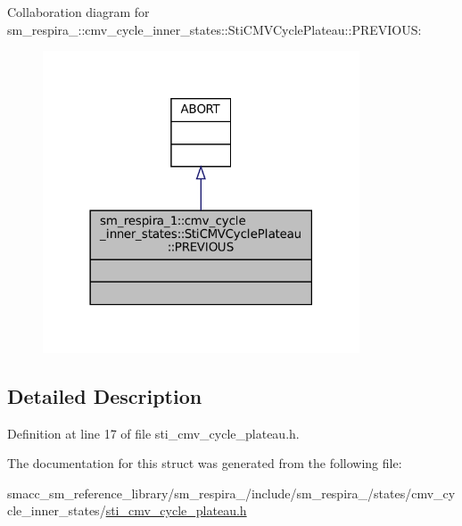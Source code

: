 Collaboration diagram for sm\+\_\+respira\+\_\+:\+:cmv\+\_\+cycle\+\_\+inner\+\_\+states\+:\+:Sti\+C\+M\+V\+Cycle\+Plateau\+:\+:P\+R\+E\+V\+I\+O\+US\+:
\nopagebreak
\begin{figure}[H]
\begin{center}
\leavevmode
\includegraphics[width=266pt]{structsm__respira__1_1_1cmv__cycle__inner__states_1_1StiCMVCyclePlateau_1_1PREVIOUS__coll__graph}
\end{center}
\end{figure}


\subsection{Detailed Description}


Definition at line 17 of file sti\+\_\+cmv\+\_\+cycle\+\_\+plateau.\+h.



The documentation for this struct was generated from the following file\+:\begin{DoxyCompactItemize}
\item 
smacc\+\_\+sm\+\_\+reference\+\_\+library/sm\+\_\+respira\+\_/include/sm\+\_\+respira\+\_/states/cmv\+\_\+cycle\+\_\+inner\+\_\+states/\hyperlink{sti__cmv__cycle__plateau_8h}{sti\+\_\+cmv\+\_\+cycle\+\_\+plateau.\+h}\end{DoxyCompactItemize}
